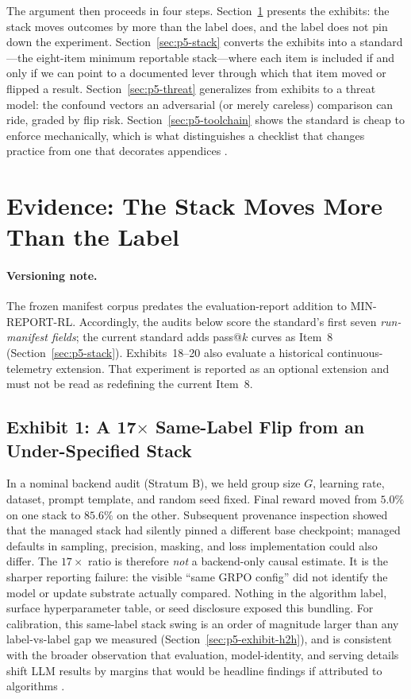 \documentclass{article}  \usepackage[preprint,nonatbib]{neurips_2026} \usepackage[numbers]{natbib}
\providecommand{\secref}[1]{Section~\ref{#1}}
\begin{document}
The argument then proceeds in four steps. \secref{sec:p5-evidence} presents the
exhibits: the stack moves outcomes by more than the label does, and the label
does not pin down the experiment. \secref{sec:p5-stack} converts the exhibits
into a standard---the eight-item minimum reportable stack---where each item is
included if and only if we can point to a documented lever through which that
item moved or flipped a result. \secref{sec:p5-threat} generalizes from
exhibits to a threat model: the confound vectors an adversarial (or merely
careless) comparison can ride, graded by flip risk. \secref{sec:p5-toolchain}
shows the standard is cheap to enforce mechanically, which is what
distinguishes a checklist that changes practice from one that decorates
appendices \citep{pineau2020improving}.
 \section{Evidence: The Stack Moves More Than the Label}
\label{sec:p5-evidence}

\paragraph{Versioning note.}
The frozen manifest corpus predates the evaluation-report addition to
MIN-REPORT-RL.  Accordingly, the audits below score the standard's first seven
\emph{run-manifest fields}; the current standard adds pass@$k$ curves as
Item~8 (\secref{sec:p5-stack}).  Exhibits~18--20 also evaluate a historical
continuous-telemetry extension.  That experiment is reported as an optional
extension and must not be read as redefining the current Item~8.

\subsection{Exhibit 1: A 17$\times$ Same-Label Flip from an Under-Specified Stack}
\label{sec:p5-exhibit-backend}
In a nominal backend audit (Stratum B), we held group size $G$, learning rate,
dataset, prompt template, and random seed fixed. Final reward moved from $5.0\%$
on one stack to $85.6\%$ on the other. Subsequent provenance inspection showed
that the managed stack had silently pinned a different base checkpoint; managed
defaults in sampling, precision, masking, and loss implementation could also
differ. The $17\times$ ratio is therefore \emph{not} a backend-only causal
estimate. It is the sharper reporting failure: the visible ``same GRPO config''
did not identify the model or update substrate actually compared. Nothing in the
algorithm label, surface hyperparameter table, or seed disclosure exposed this
bundling. For calibration, this same-label stack swing is an order of
magnitude larger than any label-vs-label gap we measured
(\secref{sec:p5-exhibit-h2h}), and is consistent with the broader observation
that evaluation, model-identity, and serving details shift LLM results by
margins that would be headline findings if attributed to algorithms
\citep{biderman2024lessons, hochlehnert2025sober}.
\end{document}
